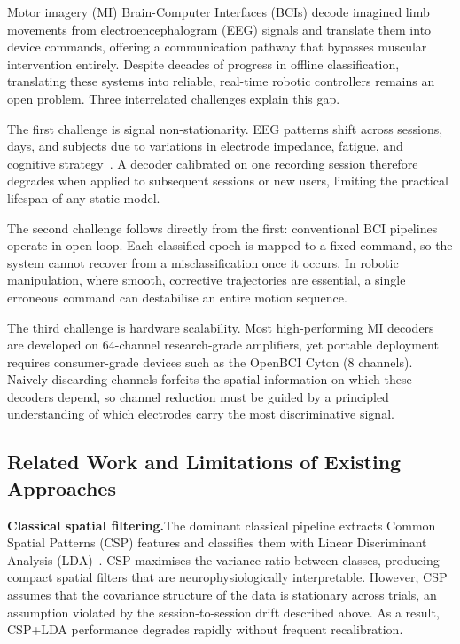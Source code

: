 \documentclass[12pt, a4paper]{article}
\begin{document}
Motor imagery (MI) Brain-Computer Interfaces (BCIs) decode imagined limb movements from electroencephalogram (EEG) signals and translate them into device commands, offering a communication pathway that bypasses muscular intervention entirely. Despite decades of progress in offline classification, translating these systems into reliable, real-time robotic controllers remains an open problem. Three interrelated challenges explain this gap.

The first challenge is signal non-stationarity. EEG patterns shift across sessions, days, and subjects due to variations in electrode impedance, fatigue, and cognitive strategy~\cite{hameed2025enhancing}. A decoder calibrated on one recording session therefore degrades when applied to subsequent sessions or new users, limiting the practical lifespan of any static model.

The second challenge follows directly from the first: conventional BCI pipelines operate in open loop. Each classified epoch is mapped to a fixed command, so the system cannot recover from a misclassification once it occurs. In robotic manipulation, where smooth, corrective trajectories are essential, a single erroneous command can destabilise an entire motion sequence.

The third challenge is hardware scalability. Most high-performing MI decoders are developed on 64-channel research-grade amplifiers, yet portable deployment requires consumer-grade devices such as the OpenBCI Cyton (8 channels). Naively discarding channels forfeits the spatial information on which these decoders depend, so channel reduction must be guided by a principled understanding of which electrodes carry the most discriminative signal.

\subsection{Related Work and Limitations of Existing Approaches}

\textbf{Classical spatial filtering.}\quad The dominant classical pipeline extracts Common Spatial Patterns (CSP) features and classifies them with Linear Discriminant Analysis (LDA)~\cite{hameed2025enhancing}. CSP maximises the variance ratio between classes, producing compact spatial filters that are neurophysiologically interpretable. However, CSP assumes that the covariance structure of the data is stationary across trials, an assumption violated by the session-to-session drift described above. As a result, CSP+LDA performance degrades rapidly without frequent recalibration.
\end{document}
